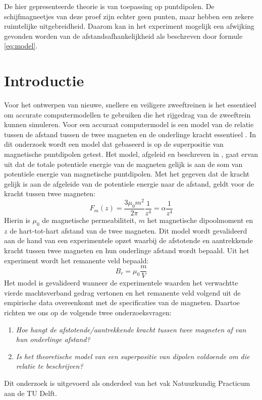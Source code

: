 De hier gepresenteerde theorie is van toepassing op puntdipolen. De schijfmagneetjes van deze proef zijn echter geen punten, maar hebben een zekere ruimtelijke uitgebreidheid. Daarom kan in het experiment mogelijk een afwijking gevonden worden van de afstandsafhankelijkheid als beschreven door formule \ref{eq:model}.
%
\section{Introductie}
Voor het ontwerpen van nieuwe, snellere en veiligere zweeftreinen is het essentieel om accurate computermodellen te gebruiken die het rijgedrag van de zweeftrein kunnen simuleren. Voor een accuraat computermodel is een model van de relatie tussen de afstand tussen de twee magneten en de onderlinge kracht essentieel \citep{sanagawa2001characteristics}. In dit onderzoek wordt een model dat gebaseerd is op de superpositie van magnetische puntdipolen getest. 
\newline
Het model, afgeleid en beschreven in \cite{Pols}, gaat ervan uit dat de totale potentiele energie van de magneten gelijk is aan de som van potentiele energie van magnetische puntdipolen. Met het gegeven dat de kracht gelijk is aan de afgeleide van de potentiele energie naar de afstand, geldt voor de kracht tussen twee magneten:
%
\begin{equation}
F_{m}(z)=\frac{3 \mu_{0} m^{2}}{2 \pi} \frac{1}{z^{4}}=\alpha \frac{1}{z^{4}}
\end{equation}
%
Hierin is $\mu_0$ de magnetische permeabiliteit, $m$ het magnetische dipoolmoment en $z$ de hart-tot-hart afstand van de twee magneten. Dit model wordt gevalideerd aan de hand van een experimentele opzet waarbij de afstotende en aantrekkende kracht tussen twee magneten en hun onderlinge afstand wordt bepaald. Uit het experiment wordt het remanente veld bepaald:
%
\begin{equation}
B_{r}=\mu_{0} \frac{m}{V}
\end{equation}
%
Het model is gevalideerd wanneer de experimentele waarden het verwachtte vierde machtsverband gedrag vertonen en het remanente veld volgend uit de empirische data overeenkomt met de specificaties van de magneten. Daartoe richten we ons op de volgende twee onderzoeksvragen:
%
\begin{enumerate}
    \item \textit{Hoe hangt de afstotende/aantrekkende kracht tussen twee magneten af van hun onderlinge afstand?}
    \item \textit{Is het theoretische model van een superpositie van dipolen voldoende om die relatie te beschrijven?}
\end{enumerate}{}
%
Dit onderzoek is uitgevoerd als onderdeel van het vak Natuurkundig Practicum aan de TU Delft.
%

